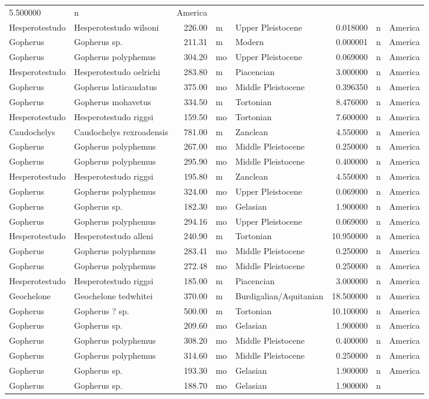 \begin{landscape}
\begin{longtable}[]{@{}llrllrll@{}}
	5.500000 & n & America\tabularnewline
	Hesperotestudo & Hesperotestudo wilsoni & 226.00 & m & Upper Pleistocene
	& 0.018000 & n & America\tabularnewline
	Gopherus & Gopherus sp. & 211.31 & m & Modern & 0.000001 & n &
	America\tabularnewline
	Gopherus & Gopherus polyphemus & 304.20 & mo & Upper Pleistocene &
	0.069000 & n & America\tabularnewline
	Hesperotestudo & Hesperotestudo oelrichi & 283.80 & m & Piacencian &
	3.000000 & n & America\tabularnewline
	Gopherus & Gopherus laticaudatus & 375.00 & mo & Middle Pleistocene &
	0.396350 & n & America\tabularnewline
	Gopherus & Gopherus mohavetus & 334.50 & m & Tortonian & 8.476000 & n &
	America\tabularnewline
	Hesperotestudo & Hesperotestudo riggsi & 159.50 & mo & Tortonian &
	7.600000 & n & America\tabularnewline
	Caudochelys & Caudochelys rexroadensis & 781.00 & m & Zanclean &
	4.550000 & n & America\tabularnewline
	Gopherus & Gopherus polyphemus & 267.00 & mo & Middle Pleistocene &
	0.250000 & n & America\tabularnewline
	Gopherus & Gopherus polyphemus & 295.90 & mo & Middle Pleistocene &
	0.400000 & n & America\tabularnewline
	Hesperotestudo & Hesperotestudo riggsi & 195.80 & m & Zanclean &
	4.550000 & n & America\tabularnewline
	Gopherus & Gopherus polyphemus & 324.00 & mo & Upper Pleistocene &
	0.069000 & n & America\tabularnewline
	Gopherus & Gopherus sp. & 182.30 & mo & Gelasian & 1.900000 & n &
	America\tabularnewline
	Gopherus & Gopherus polyphemus & 294.16 & mo & Upper Pleistocene &
	0.069000 & n & America\tabularnewline
	Hesperotestudo & Hesperotestudo alleni & 240.90 & m & Tortonian &
	10.950000 & n & America\tabularnewline
	Gopherus & Gopherus polyphemus & 283.41 & mo & Middle Pleistocene &
	0.250000 & n & America\tabularnewline
	Gopherus & Gopherus polyphemus & 272.48 & mo & Middle Pleistocene &
	0.250000 & n & America\tabularnewline
	Hesperotestudo & Hesperotestudo riggsi & 185.00 & m & Piacencian &
	3.000000 & n & America\tabularnewline
	Geochelone & Geochelone tedwhitei & 370.00 & m & Burdigalian/Aquitanian
	& 18.500000 & n & America\tabularnewline
	Gopherus & Gopherus ? sp. & 500.00 & m & Tortonian & 10.100000 & n &
	America\tabularnewline
	Gopherus & Gopherus sp. & 209.60 & mo & Gelasian & 1.900000 & n &
	America\tabularnewline
	Gopherus & Gopherus polyphemus & 308.20 & mo & Middle Pleistocene &
	0.400000 & n & America\tabularnewline
	Gopherus & Gopherus polyphemus & 314.60 & mo & Middle Pleistocene &
	0.250000 & n & America\tabularnewline
	Gopherus & Gopherus sp. & 193.30 & mo & Gelasian & 1.900000 & n &
	America\tabularnewline
	Gopherus & Gopherus sp. & 188.70 & mo & Gelasian & 1.900000 & n &

\end{longtable}
\end{landscape}
